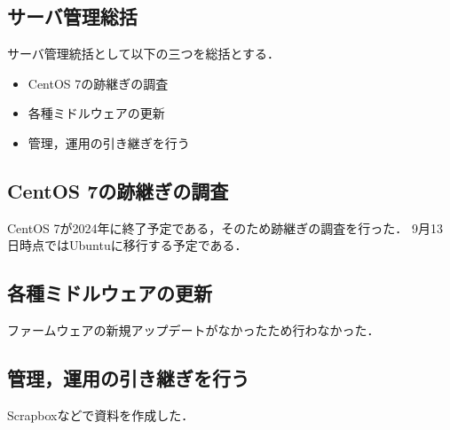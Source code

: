 \subsection*{サーバ管理総括}


サーバ管理統括として以下の三つを総括とする．
\begin{itemize}
    \item CentOS 7の跡継ぎの調査
    \item 各種ミドルウェアの更新
    \item 管理，運用の引き継ぎを行う
\end{itemize}

\subsection*{CentOS 7の跡継ぎの調査}
CentOS 7が2024年に終了予定である，そのため跡継ぎの調査を行った．
9月13日時点ではUbuntuに移行する予定である．

\subsection*{各種ミドルウェアの更新}
ファームウェアの新規アップデートがなかったため行わなかった．

\subsection*{管理，運用の引き継ぎを行う}
Scrapboxなどで資料を作成した．
